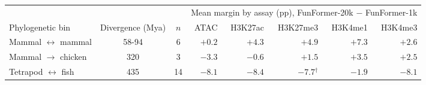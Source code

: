 \begin{tabular}{l c c r r r r r }
\toprule
 & & & \multicolumn{5}{c}{Mean margin by assay (pp), FunFormer-20k $-$ FunFormer-1k} \\
\cmidrule(lr){4-8}
Phylogenetic bin & Divergence (Mya) & $n$ & ATAC & H3K27ac & H3K27me3 & H3K4me1 & H3K4me3 \\
\midrule
Mammal $\leftrightarrow$ mammal & 58-94 & 6 & $+0.2$ & $+4.3$ & $+4.9$ & $+7.3$ & $+2.6$ \\
Mammal $\rightarrow$ chicken & 320 & 3 & $-3.3$ & $-0.6$ & $+1.5$ & $+3.5$ & $+2.5$ \\
Tetrapod $\leftrightarrow$ fish & 435 & 14 & $-8.1$ & $-8.4$ & $-7.7$$^{\dagger}$ & $-1.9$ & $-8.1$ \\
\bottomrule
\end{tabular}
